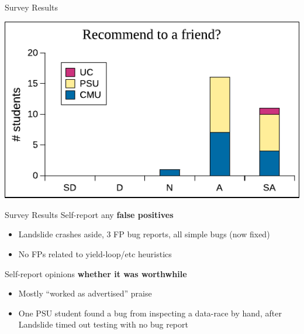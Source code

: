 \documentclass[xcolor=dvipsnames]{beamer}
\begin{document}
\begin{frame}{Survey Results} %
	\begin{center}
		\includegraphics[width=\textwidth]{../survey10.pdf} %
	\end{center}
\end{frame}

\begin{frame}{Survey Results}
	Self-report any {\bf false positives}
	\begin{itemize}
		\item Landslide crashes aside, 3 FP bug reports, all simple bugs (now fixed)
		\item No FPs related to yield-loop/etc heuristics
	\end{itemize}
	\pause
	\linegap

	Self-report opinions {\bf whether it was worthwhile}
	\begin{itemize}
		\item Mostly ``worked as advertised'' praise
		\item One PSU student found a bug from inspecting a data-race by hand,
			after Landslide timed out testing with no bug report
	\end{itemize}
\end{frame}
\end{document}
